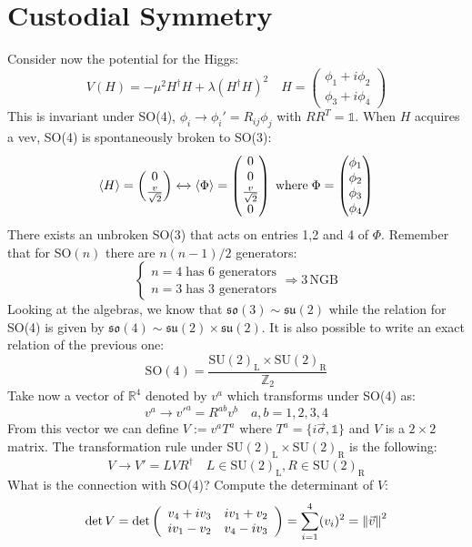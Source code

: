 \documentclass[../main.tex]{subfiles}
\begin{document}
\section{Custodial Symmetry}
Consider now the potential for the Higgs:
\[
V(H)=-\mu^2H^\dagger H+\lambda(H^\dagger H)^2 \quad H=\begin{pmatrix}\phi_1+i\phi_2\\\phi_3+i\phi_4\end{pmatrix}
\]
This is invariant under SO(4), $\phi_i\to\phi_i'=R_{ij}\phi_j$ with $RR^T=\mathbb{1}$. When $H$ acquires a vev, SO(4) is spontaneously broken to SO(3):
\[
\Braket{H}=\begin{pmatrix}0\\\frac{v}{\sqrt{2}}\end{pmatrix}\xleftrightarrow[]{}\Braket{\Phi}=\begin{pmatrix}0\\0\\\frac{v}{\sqrt{2}}\\0\end{pmatrix} \;\text{where}\;\Phi=\begin{pmatrix}\phi_1\\\phi_2\\\phi_3\\\phi_4\end{pmatrix}
\]
There exists an unbroken SO(3) that acts on entries 1,2 and 4 of $\Phi$. Remember that for SO$(n)$ there are $n(n-1)/2$ generators:
\[
\begin{cases}
n=4 \;\text{has 6 generators}\\
n=3 \;\text{has 3 generators}
\end{cases}
\Rightarrow 3\,\text{NGB}
\]
Looking at the algebras, we know that $\mathfrak{so}(3)\sim\mathfrak{su}(2)$ while the relation for SO(4) is given by $\mathfrak{so}(4)\sim\mathfrak{su}(2)\times\mathfrak{su}(2)$. It is also possible to write an exact relation of the previous one:
\[
\text{SO}(4)=\frac{\text{SU}(2)_{\text{L}}\times\text{SU}(2)_{\text{R}}}{\mathbb{Z}_2}
\]
Take now a vector of $\mathbb{R}^4$ denoted by $v^a$ which transforms under SO(4) as:
\[
v^a\to v'^a=R^{ab}v^b \quad a,b=1,2,3,4
\]
From this vector we can define $V:=v^aT^a$ where $T^a=\{i\Vec{\sigma},\mathbb{1}\}$ and $V$ is a $2\times2$ matrix. The transformation rule under SU$(2)_{\text{L}}\times$SU$(2)_{\text{R}}$ is the following:
\[
V\to V'=LVR^\dagger \quad L\in\text{SU}(2)_{\text{L}}, R\in\text{SU}(2)_{\text{R}}
\]
What is the connection with SO(4)? Compute the determinant of $V$:
\[
\det V=\det\left(\begin{array}{cc}
    v_4+iv_3 & iv_1+v_2 \\
    iv_1-v_2 & v_4-iv_3
\end{array}\right)=\sum_{i=1}^4(v_i)^2=\norm{\Vec{v}}^2
\]
\end{document}
